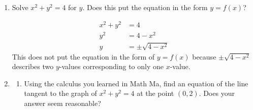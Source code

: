 \documentclass[main]{subfiles}
\begin{document}
\begin{enumerate}[resume]
\begin{enumerate}
\begin{center}
\end{center}
\end{enumerate}

\pspace{\newpage}

\item 
\begin{problem}
Solve $x^2+y^2=4$ for $y$. Does this put the equation in the form $y=f(x)$?
\end{problem}
\pspace{\vfill}

    \begin{solution}
        \begin{align*}
            x^2+y^2&=4\\
            y^2&=4-x^2\\
            y&=\pm\sqrt{4-x^2}
        \end{align*}
        This does not put the equation in the form of $y=f(x)$ because $\pm\sqrt{4-x^2}$ describes two $y$-values corresponding to only one $x$-value.
    \end{solution}

\item 
\begin{enumerate}
\item
\begin{problem}
Using the calculus you learned in Math Ma, find an equation of the line tangent to the graph of $x^2+y^2=4$ at the point $(0, 2)$. Does your answer seem reasonable?
\end{problem}
\pspace{\vfill}


\end{enumerate}
\end{enumerate}
\end{document}
